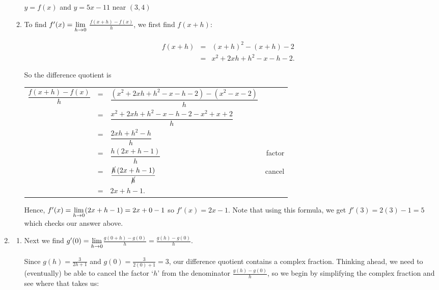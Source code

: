 \documentclass{ximera}
\begin{document}
\begin{ex}
\begin{enumerate}
\begin{enumerate}
\begin{center}
 $y = f(x)$ and  $y = 5x-11$  near $(3,4)$  

 \end{center}

 \item To find $f'(x) = \ds{\lim_{h \rightarrow 0}}$ $\frac{f(x+h)-f(x)}{h}$, we first find $f(x+h)$:


\[ \begin{array}{rclr}  
 
 f(x+h) & = & (x+h)^2 - (x+h) -2 & \\ [8pt]
 & = & x^2 + 2xh + h^2 - x - h - 2.
 \end{array} \]

So the difference quotient is

\setlength{\extrarowheight}{12pt}

\begin{longtable}{rclr}  

$\dfrac{f(x+h)-f(x)}{h}$ & = & $\dfrac{\left(x^2+2xh+h^2-x-h-2 \right)-\left(x^{2}-x-2 \right)}{h}$ & \\[8pt] 
& = & $\dfrac{x^2+2xh+h^2-x-h-2-x^2+x+2}{h}$ & \\[8pt]
& = & $\dfrac{2xh+h^2-h}{h}$ & \\[8pt]
& = & $\dfrac{h \left(2x+h-1\right)}{h}$ & factor \\[8pt]
& = & $\dfrac{\cancel{h} \left(2x+h-1\right)}{\cancel{h}}$ & cancel \\[8pt]
& = & $2x+h-1$. \\

\end{longtable} 

Hence, $f'(x) = \ds{\lim_{h \rightarrow 0} (2x+h-1) = 2x + 0 - 1}$ so $f'(x) = 2x-1$. Note that using this formula, we get  $f'(3) = 2(3)-1 = 5$ which checks our answer above.


\end{enumerate}

\item  \begin{enumerate} \item Next we find  $g'(0) = \ds{\lim_{h \rightarrow 0}}$$\frac{g(0+h)-g(0)}{h}  = \frac{g(h) - g(0)}{h}$.

Since $g(h) = \frac{3}{2 h + 1}$ and $g(0) = \frac{3}{2(0)+1} = 3$, our difference quotient contains a complex fraction.  Thinking ahead, we need to (eventually) be able to cancel the factor `$h$' from the denominator $\frac{g(h) - g(0)}{h}$, so we begin by simplifying the complex fraction and see where that takes us:


\end{enumerate}
\end{enumerate}
\end{ex}
\end{document}
